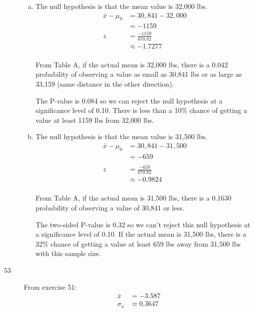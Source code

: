 \documentclass[letterpaper, landscape]{exam}
\begin{document}
\begin{description}
\begin{enumerate}[(a)]
          \item 
            The null hypothesis is that the mean value is 32,000 lbs.
            \begin{align*}
              \bar{x} - \mu_0 & = 30,841 - 32,000 \\
                              & = -1159 \\
              z & = \frac{-1159}{670.82} \\
                & \approx -1.7277 \\
            \end{align*}

            From Table A, if the actual mean is 32,000 lbs, there is a 0.042
            probability of observing a value as small as 30,841 lbs or as large
            as 33,159 (same distance in the other direction).

            The P-value is 0.084 so we can reject the null hypothesis at a
            significance level of 0.10. There is less than a 10\% chance of
            getting a value at least 1159 lbs from 32,000 lbs.

          \item 
            The null hypothesis is that the mean value is 31,500 lbs.
            \begin{align*}
              \bar{x} - \mu_0 & = 30,841 - 31,500 \\
                              & = -659 \\
              \\
              z  & = \frac{-659}{670.82} \\
                 & \approx -0.9824 \\
            \end{align*}

            From Table A, if the actual mean is 31,500 lbs, there is a 0.1630
            probability of observing a value of 30,841 or less.

            The two-sided P-value is 0.32 so we can't reject this null hypothesis
            at a significance level of 0.10. If the actual mean is 31,500 lbs,
            there is a 32\% chance of getting a value at least 659 lbs away from
            31,500 lbs with this sample size.

        \end{enumerate}

      \item[53]
        From exercise 51:
        \begin{align*}
            \bar{x}          & = -3.587 \\
            \sigma_{\bar{x}} & \approx 0.3647 \\
        \end{align*}


\end{description}
\end{document}
